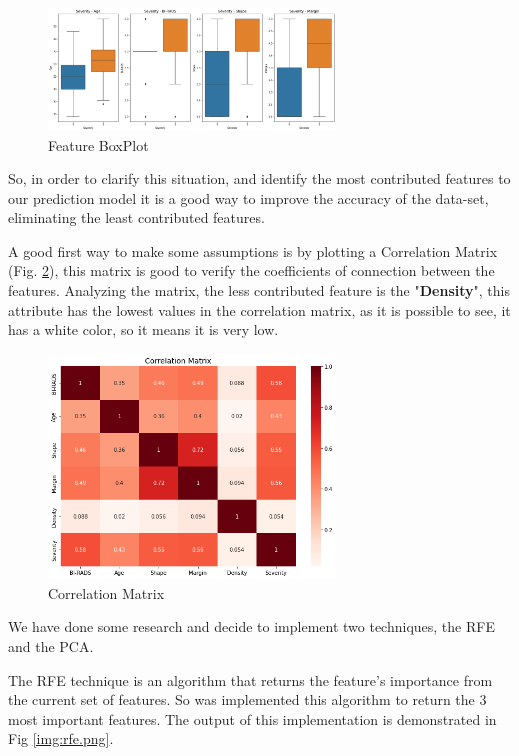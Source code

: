 \documentclass[conference]{IEEEtran}
\begin{document}
\begin{figure}[!h]
    \centering
    \includegraphics[width=3.0in]{box_plot.png}
    \caption{Feature BoxPlot}
    \label{img:box_plot.png}
\end{figure}



So, in order to clarify this situation, and identify the most contributed features to our prediction model it is a good way to improve the accuracy of the data-set, eliminating the least contributed features. 

A good first way to make some assumptions is by plotting a Correlation Matrix (Fig. \ref{img:corr_matrix}), this matrix is good to verify the coefficients of connection between the features. Analyzing the matrix, the less contributed feature is the "\textbf{Density}", this attribute has the lowest values in the correlation matrix, as it is possible to see, it has a white color, so it means it is very low.

\begin{figure}[!h]
    \centering
    \includegraphics[width=3.0in]{corr_matrix.png}
    \caption{Correlation Matrix}
    \label{img:corr_matrix}
\end{figure}

We have done some research \cite{featureelimination} and decide to implement two techniques, the RFE and the PCA.

The RFE technique \cite{rfe} is an algorithm that returns the feature's importance from the current set of features. So was implemented this algorithm to return the 3 most important features. The output of this implementation is demonstrated in Fig \ref{img:rfe.png}. 
\end{document}
